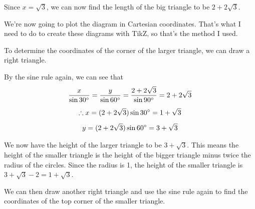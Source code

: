 \documentclass[a4paper]{article}
\begin{document}
Since $x = \sqrt{3}$, we can now find the length of the big triangle to be $2 + 2\sqrt{3}$.

We're now going to plot the diagram in Cartesian coordinates. That's what I need to do to create these diagrams with TikZ, so that's the method I used.

To determine the coordinates of the corner of the larger triangle, we can draw a right triangle.

\vspace*{0.5em}
\hspace{\fill}
\hspace{\fill}
\vspace*{0.5em}

By the sine rule again, we can see that
\begin{gather*}
\frac{x}{\sin 30\degree} = \frac{y}{\sin 60\degree} = \frac{2 + 2\sqrt{3}}{\sin 90\degree} = 2 + 2\sqrt{3}\\[0.5em]
\therefore x = (2 + 2\sqrt{3}) \sin 30\degree = 1 + \sqrt{3}\\[0.5em]
y = (2 + 2\sqrt{3}) \sin 60\degree = 3 + \sqrt{3}
\end{gather*}

We now have the height of the larger triangle to be $3 + \sqrt{3}$. This means the height of the smaller triangle is the height of the bigger triangle minus twice the radius of the circles. Since the radius is 1, the height of the smaller triangle is $3 + \sqrt{3} - 2 = 1 + \sqrt{3}$.

We can then draw another right triangle and use the sine rule again to find the coordinates of the top corner of the smaller triangle.

\vspace*{0.5em}
\hspace{\fill}
\hspace{\fill}
\vspace*{0.5em}
\end{document}

